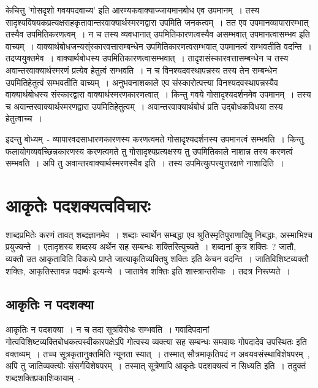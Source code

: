 		केचित्तु 'गोसदृशो गवयपदवाच्य' इति आरण्यकवाक्याज्जायमानबोध एव उपमानम्~। तस्य सादृश्यविषयकप्रत्यक्षसहकृतावान्तरवाक्यार्थस्मरणद्वारा उपमिति जनकत्वम्~। तत एव उपमानव्यापारारम्भात् तस्यैव उपमितिकरणत्वम्~। न च तस्य व्यवधानात् उपमितिकारणत्वस्यैव असम्भवात् उपमानत्वासम्भव इति वाच्यम्~। वाक्यार्थबोधजन्यस्ंस्कारवत्तासम्बन्धेन उपमितिकारणत्वसम्भवात् उपमानत्वं सम्भवतीति वदन्ति~। तदप्ययुक्तमेव~। वाक्यार्थबोधस्य उपमितिकारणत्वासम्भवात्~। तादृशसंस्कारवत्तासम्बन्धेन च तस्य अवान्तरवाक्यार्थस्मरणं प्रत्येव हेतुत्वं सम्भवति~। न च विनश्यदवस्थापन्नस्य तस्य तेन सम्बन्धेन उपमितिहेतुत्वं सम्भवतीति वाच्यम्~। अनुभवनाशकाले एव संस्कारोत्पत्त्या विनश्यदवस्थापन्नस्यैव वाक्यार्थबोधस्य संस्कारद्वारा वाक्यार्थस्मरणकारणत्वात्~। किन्तु गवये गोसादृश्यदर्शनमेव उपमानम्~। तस्य च अवान्तरवाक्यार्थस्मरणद्वारा उपमितिहेतुत्वम्~। अवान्तरवाक्यार्थबोधं प्रति उद्बोधकविधया तस्य हेतुत्वाच्च~।‌ 

		इदन्तु बोध्यम्~- व्यापारवदसाधारणकारणस्य करणत्वमते गोसादृश्यदर्शनस्य उपमानत्वं सम्भवति~। किन्तु फलायोगव्यवच्छिन्नकारणस्य करणत्वमते तु गोसादृश्यप्रत्यक्षस्य तु उपमितिकाले नाशान्न तस्य करणत्वं सम्भवति~। अपि तु अवान्तरवाक्यार्थस्मरणस्यैव इति~। तस्य उपमित्युत्पत्त्युत्तरक्षणे नाशादिति~।



	\section{आकृतेः पदशक्यत्वविचारः}

	शाब्दप्रमितेः‌ करणं तावत् शब्दज्ञानमेव~। शब्दाः स्वार्थेन सम्बद्धा एव श्रुतिस्मृतिपुराणादिषु निबद्धाः, अस्माभिश्च प्रयुज्यन्ते~। एतादृशस्य शब्दस्य अर्थेन सह सम्बन्धः‌ शक्तिरित्युच्यते~। शब्दानां कुत्र शक्तिः~? जातौ, व्यक्तौ उत आकृताविति विकल्पे प्राप्ते जात्याकृतिव्यक्तिषु शक्तिः इति केचन वदन्ति~। जातिविशिष्टव्यक्तौ शक्तिः, आकृतिस्तावन्न पदार्थः इत्यन्ये~। जातावेव शक्तिः‌ इति शास्त्रान्तरीयाः‌~। तदत्र निरूप्यते~।

		\subsection{आकृतिः न पदशक्या}

		आकृतिः न पदशक्या~। न च तदा सूत्रविरोधः सम्भवति~। गवादिपदानां गोत्वविशिष्टव्यक्तिबोधकत्वस्वीकारपक्षेऽपि गोत्वस्य व्यक्त्या सह सम्बन्धः समवायः गोपदादेव उपस्थितः इति वक्तव्यम्~। तच्च सूत्रकृतानुक्तमिति न्यूनता स्यात्~। तस्मात् सौत्रमाकृतिपदं न अवयवसंस्थाविशेषपरम्~, अपि तु जातिव्यक्त्योः संसर्गविशेषपरम्~। तस्मात् सूत्रेणापि आकृतेः पदशक्यत्वं‌ न सिध्यति इति~। तदुक्तं शब्दशक्तिप्रकाशिकायाम्~- 

